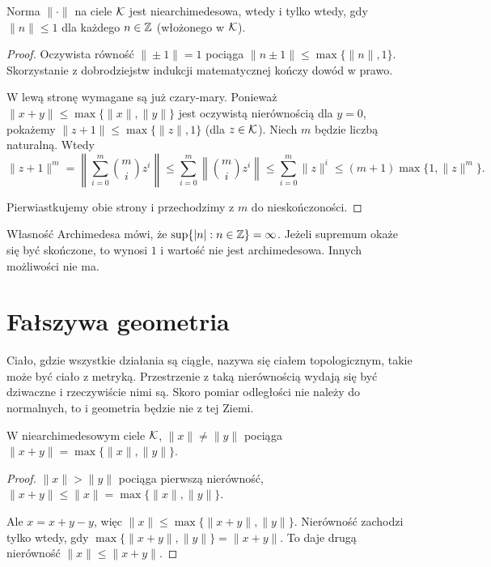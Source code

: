 \begin{fakt}
	Norma  $\|\cdot\|$ na ciele $\mathcal K$ jest niearchimedesowa, wtedy i tylko wtedy, gdy $\|n\| \le 1$ dla każdego $n \in \mathbb Z$ (włożonego w $\mathcal K$).
\end{fakt}

\begin{proof}
	Oczywista równość $\|\pm 1\| = 1$ pociąga $\|n \pm 1\| \le \max \{\|n\|, 1\}$.	
	Skorzystanie z dobrodziejstw indukcji matematycznej kończy dowód w prawo.

	W lewą stronę wymagane są już czary-mary.
	Ponieważ $\|x + y\| \le \max \{\|x\|, \|y\|\}$ jest oczywistą nierównością dla $y = 0$, pokażemy $\|z+1\| \le \max \{\|z\|, 1\}$ (dla $z \in \mathcal K$).
	Niech $m$ będzie liczbą naturalną.
	Wtedy
	\[
		\|z+1\|^m 
		=   \left\|\sum_{i=0}^m {m \choose i} z^i \right\| 
		\le \sum_{i=0}^m \left\|{m \choose i} z^i \right\| 
		\le \sum_{i=0}^m \|z\|^i
		\le (m+1) \max \{1, \|z\|^m\}.
	\]

	Pierwiastkujemy obie strony i przechodzimy z $m$ do nieskończoności.
\end{proof}

Własność Archimedesa mówi, że $\sup\{|n| : n \in \mathbb Z\} = \infty$.
Jeżeli supremum okaże się być skończone, to wynosi $1$ i wartość nie jest archimedesowa.
Innych możliwości nie ma.

\begin{historia}\end{historia}

\section{Fałszywa geometria}
Ciało, gdzie wszystkie działania są ciągłe, nazywa się ciałem topologicznym, takie może być ciało z metryką.
Przestrzenie z taką nierównością wydają się być dziwaczne i rzeczywiście nimi są.
Skoro pomiar odległości nie należy do normalnych, to i geometria będzie nie z tej Ziemi.

\begin{fakt}
	W  niearchimedesowym ciele $\mathcal K$, $\|x\| \neq \|y\|$ pociąga $\|x+y\| = \max \{\|x\|, \|y\|\}$.
\end{fakt}

\begin{proof}
	$\|x\| > \|y\|$ pociąga pierwszą nierówność, $\|x+y\| \le \|x\| = \max\{\|x\|,\|y\|\}$.

	Ale $x = x+y-y$, więc $\|x\| \le \max \{\|x+y\|, \|y\|\}$.
	Nierówność zachodzi tylko wtedy, gdy $\max\{\|x+y\|, \|y\|\} = \|x+y\|$.
	To daje drugą nierówność $\|x\| \le \|x+y\|$.
\end{proof}

